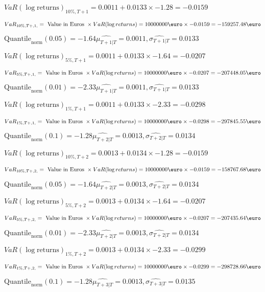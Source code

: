 $VaR(\log \text{returns})_{10\%, T + 1} = 0.0011 + 0.0133\times-1.28 = -0.0159$

$VaR_{10\%, T + ,1,} = \text{ Value in Euros } \times VaR(\log returns) = 10 000 000 \text{\euro} \times-0.0159 = -159257.48 \text{\euro}$


$\text{Quantile}_\text{norm}(0.05) = -1.64$$\hat{\mu_{T+1|T}} = 0.0011, \hat{\sigma_{T+1|T}} = 0.0133$

$VaR(\log \text{returns})_{5\%, T + 1} = 0.0011 + 0.0133\times-1.64 = -0.0207$

$VaR_{5\%, T + ,1,} = \text{ Value in Euros } \times VaR(\log returns) = 10 000 000 \text{\euro} \times-0.0207 = -207448.05 \text{\euro}$


$\text{Quantile}_\text{norm}(0.01) = -2.33$$\hat{\mu_{T+1|T}} = 0.0011, \hat{\sigma_{T+1|T}} = 0.0133$

$VaR(\log \text{returns})_{1\%, T + 1} = 0.0011 + 0.0133\times-2.33 = -0.0298$

$VaR_{1\%, T + ,1,} = \text{ Value in Euros } \times VaR(\log returns) = 10 000 000 \text{\euro} \times-0.0298 = -297845.55 \text{\euro}$


$\text{Quantile}_\text{norm}(0.1) = -1.28$$\hat{\mu_{T+2|T}} = 0.0013, \hat{\sigma_{T+2|T}} = 0.0134$

$VaR(\log \text{returns})_{10\%, T + 2} = 0.0013 + 0.0134\times-1.28 = -0.0159$

$VaR_{10\%, T + ,2,} = \text{ Value in Euros } \times VaR(\log returns) = 10 000 000 \text{\euro} \times-0.0159 = -158767.68 \text{\euro}$


$\text{Quantile}_\text{norm}(0.05) = -1.64$$\hat{\mu_{T+2|T}} = 0.0013, \hat{\sigma_{T+2|T}} = 0.0134$

$VaR(\log \text{returns})_{5\%, T + 2} = 0.0013 + 0.0134\times-1.64 = -0.0207$

$VaR_{5\%, T + ,2,} = \text{ Value in Euros } \times VaR(\log returns) = 10 000 000 \text{\euro} \times-0.0207 = -207435.64 \text{\euro}$


$\text{Quantile}_\text{norm}(0.01) = -2.33$$\hat{\mu_{T+2|T}} = 0.0013, \hat{\sigma_{T+2|T}} = 0.0134$

$VaR(\log \text{returns})_{1\%, T + 2} = 0.0013 + 0.0134\times-2.33 = -0.0299$

$VaR_{1\%, T + ,2,} = \text{ Value in Euros } \times VaR(\log returns) = 10 000 000 \text{\euro} \times-0.0299 = -298728.66 \text{\euro}$


$\text{Quantile}_\text{norm}(0.1) = -1.28$$\hat{\mu_{T+3|T}} = 0.0013, \hat{\sigma_{T+3|T}} = 0.0135$

